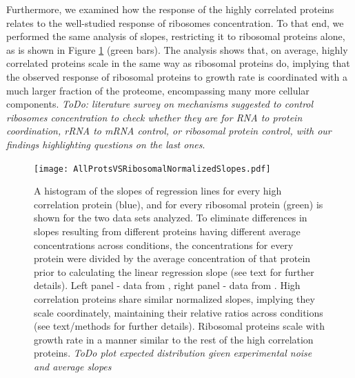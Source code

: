 \documentclass[notitlepage]{article}
\begin{document}
Furthermore, we examined how the response of the highly correlated proteins relates to the well-studied response of ribosomes concentration.
To that end, we performed the same analysis of slopes, restricting it to ribosomal proteins alone, as is shown in Figure \ref{fig:globalfit} (green bars).
The analysis shows that, on average, highly correlated proteins scale in the same way as ribosomal proteins do, implying that the observed response of ribosomal proteins to growth rate is coordinated with a much larger fraction of the proteome, encompassing many more cellular components.
\emph{ToDo: literature survey on mechanisms suggested to control ribosomes concentration to check whether they are for RNA to protein coordination, rRNA to mRNA control, or ribosomal protein control, with our findings highlighting questions on the last ones}.

\begin{figure}[h]
\centering
\texttt{[image: AllProtsVSRibosomalNormalizedSlopes.pdf]}
\caption{
    A histogram of the slopes of regression lines for every high correlation protein (blue), and for every ribosomal protein (green) is shown for the two data sets analyzed.
    To eliminate differences in slopes resulting from different proteins having different average concentrations across conditions, the concentrations for every protein were divided by the average concentration of that protein prior to calculating the linear regression slope (see text for further details).
    Left panel - data from \parencite{Valgepea2013}, right panel - data from \parencite{Heinemann2014}.
    High correlation proteins share similar normalized slopes, implying they scale coordinately, maintaining their relative ratios across conditions (see text/methods for further details).
    Ribosomal proteins scale with growth rate in a manner similar to the rest of the high correlation proteins.
    \emph{ToDo plot expected distribution given experimental noise and average slopes}
}
\label{fig:globalfit}
\end{figure}
\end{document}
